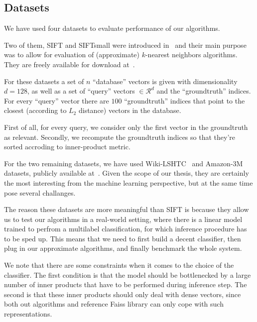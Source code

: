     \subsection{Datasets}\label{subsec:datasets}

        We have used four datasets to evaluate performance of our algorithms.

        Two of them, SIFT and SIFTsmall were introduced in~\cite{jegou2011product} and their
        main purpose was to allow for evaluation of (approximate) $k$-nearest neighbors algorithms. They are freely
        available for download at~\cite{sift}.

        For these datasets a set of $n$ ``database'' vectors is given with dimensionality
        $d=128$, as well as a set of ``query'' vectors $\in \mathcal{R}^d$
        and the ``groundtruth'' indices. For every ``query'' vector there are $100$ ``groundtruth'' indices
        that point to the closest (according to $L_2$ distance) vectors in the database.

        First of all, for every query, we consider only the first vector in the groundtruth as relevant.
        Secondly, we recompute the groundtruth indices so that they're sorted accroding to inner-product
        metric.

        For the two remaining datasets, we have used Wiki-LSHTC~\cite{lshtc} and
        Amazon-3M~\cite{a3m} datasets, publicly available at~\cite{exrepo}.
        Given the scope of our thesis, they are certainly the most interesting from the machine learning perspective,
        but at the same time pose several challanges.

        The reason these datasets are more meaningful than SIFT is because they allow us to test our
        algorithms in a real-world setting, where there is a linear model trained to perfrom a multilabel
        classification, for which inference procedure has to be sped up.
        This means that we need to first build a decent classifier, then plug in our approximate algorithms,
        and finally benchmark the whole system.

        We note that there are some constraints when it comes to the choice of the classifier. The first condition
        is that the model should be bottlenecked by a large number of inner products that have to be performed during
        inference step. The second is that these inner products should only deal with dense vectors, since both
        out algorithms and reference Faiss library can only cope with such representations.

